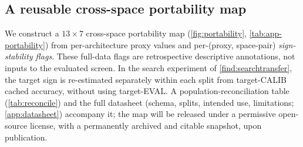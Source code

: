 
\subsection{A reusable cross-space portability map}
\label{sec:artifact}
We construct a $13{\times}7$ cross-space portability map
(\cref{fig:portability}, \cref{tab:app-portability}) from per-architecture proxy
values and per-(proxy, space-pair) \emph{sign-stability flags}. These full-data
flags are retrospective descriptive annotations, not inputs to the evaluated
screen. In the search experiment of \cref{find:searchtransfer}, the target sign
is re-estimated separately within each split from target-CALIB cached accuracy,
without using target-EVAL. A population-reconciliation table
(\cref{tab:reconcile}) and the full datasheet (schema, splits,
intended use, limitations; \cref{app:datasheet}) accompany it; the map will be released under a permissive open-source license, with
a permanently archived and citable snapshot, upon publication.
